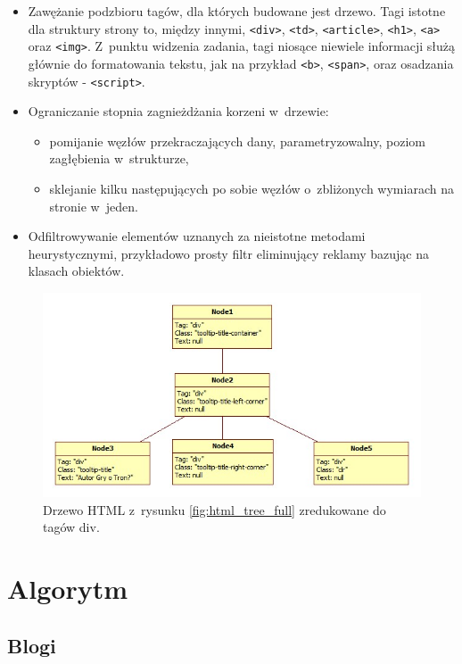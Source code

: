 \documentclass[a4paper,10pt]{article}
\begin{document}
\begin{itemize}
 \item Zawężanie podzbioru tagów, dla których budowane jest drzewo. Tagi istotne dla struktury strony to, między innymi, \verb+<div>+, \verb+<td>+, \verb+<article>+, \verb+<h1>+, \verb+<a>+ oraz \verb+<img>+. Z~punktu widzenia zadania, tagi niosące niewiele informacji służą głównie do formatowania tekstu, jak na przykład \verb+<b>+, \verb+<span>+, oraz osadzania skryptów - \verb+<script>+.
 \item Ograniczanie stopnia zagnieżdżania korzeni w~drzewie:
    \begin{itemize}
	\item pomijanie węzłów przekraczających dany, parametryzowalny, poziom zagłębienia w~strukturze,
	\item sklejanie kilku następujących po sobie węzłów o~zbliżonych wymiarach na stronie w~jeden.
    \end{itemize}
 \item Odfiltrowywanie elementów uznanych za nieistotne metodami heurystycznymi, przykładowo prosty filtr eliminujący reklamy bazując na klasach obiektów.
\end{itemize}

\begin{figure}[h!]
\centering
  \includegraphics[width=.9\textwidth]{html_tree_cropped.jpg}
  \caption{Drzewo HTML z~rysunku \ref{fig:html_tree_full} zredukowane do tagów div.}
  \label{fig:html_tree_cropped}
\end{figure}

\section*{Algorytm}
\subsection*{Blogi}
\end{document}
